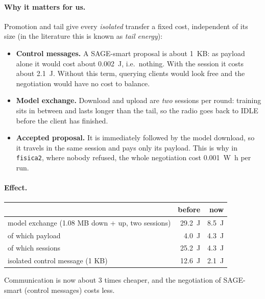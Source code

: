 \documentclass[11pt,a4paper]{article}
\begin{document}
\paragraph{Why it matters for us.} Promotion and tail give every
\emph{isolated} transfer a fixed cost, independent of its size (in the
literature this is known as \emph{tail energy}):
\begin{itemize}
  \item \textbf{Control messages.} A SAGE-smart proposal is about 1~KB: as
        payload alone it would cost about \SI{0.002}{\joule}, i.e.\ nothing.
        With the session it costs about \SI{2.1}{\joule}. Without this term,
        querying clients would look free and the negotiation would have no
        cost to balance.
  \item \textbf{Model exchange.} Download and upload are \emph{two} sessions
        per round: training sits in between and lasts longer than the tail,
        so the radio goes back to IDLE before the client has finished.
  \item \textbf{Accepted proposal.} It is immediately followed by the model
        download, so it travels in the same session and pays only its
        payload. This is why in \texttt{fisica2}, where nobody refused, the
        whole negotiation cost \SI{0.001}{\watt\hour} per run.
\end{itemize}

\paragraph{Effect.}
\begin{center}
\begin{tabular}{lrr}
\toprule
& before & now \\
\midrule
model exchange (1.08 MB down + up, two sessions) & \SI{29.2}{\joule} & \SI{8.5}{\joule} \\
\quad of which payload & \SI{4.0}{\joule} & \SI{4.3}{\joule} \\
\quad of which sessions & \SI{25.2}{\joule} & \SI{4.3}{\joule} \\
isolated control message (1 KB) & \SI{12.6}{\joule} & \SI{2.1}{\joule} \\
\bottomrule
\end{tabular}
\end{center}
Communication is now about 3 times cheaper, and the negotiation of SAGE-smart
(control messages) costs less.

\end{document}
